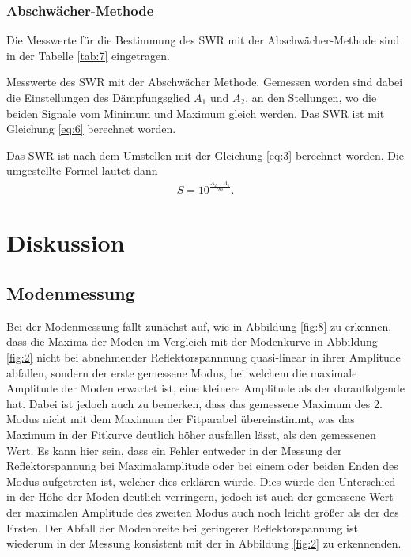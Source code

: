                 \subsubsection{Abschwächer-Methode}
                    Die Messwerte für die Bestimmung des SWR mit der Abschwächer-Methode sind in der Tabelle \ref{tab:7} eingetragen.
                        \begin{table}[H]
                            \centering
                            \caption{
                                Messwerte des SWR mit der Abschwächer Methode.
                                Gemessen worden sind dabei die Einstellungen des Dämpfungsglied $A_1$ und $A_2$, an den Stellungen,
                                wo die beiden Signale vom Minimum und Maximum gleich werden. Das SWR ist mit Gleichung \eqref{eq:6} berechnet worden.
                            }
                            
                            \label{tab:7} 
                        \end{table} 
                        Das SWR ist nach dem Umstellen mit der Gleichung \eqref{eq:3} berechnet worden.
                        Die umgestellte Formel lautet dann
                        \begin{align}
                            S = 10^{\frac{A_2-A_1}{20}}. \label{eq:6}
                        \end{align}

%
%
    \section{Diskussion}
        
        \subsection{Modenmessung}
            Bei der Modenmessung fällt zunächst auf, wie in Abbildung \ref{fig:8} zu erkennen, dass die Maxima der Moden im Vergleich mit der Modenkurve in Abbildung \ref{fig:2} nicht bei abnehmender Reflektorspannnung quasi-linear in ihrer Amplitude abfallen, sondern der erste gemessene Modus, bei welchem die maximale Amplitude der Moden erwartet ist, eine kleinere Amplitude als der darauffolgende hat.\newline
            Dabei ist jedoch auch zu bemerken, dass das gemessene Maximum des 2. Modus nicht mit dem Maximum der Fitparabel übereinstimmt, was das Maximum in der Fitkurve deutlich höher ausfallen lässt, als den gemessenen Wert.
            \newline
            Es kann hier sein, dass ein Fehler entweder in der Messung der Reflektorspannung bei Maximalamplitude oder bei einem oder beiden Enden des Modus aufgetreten ist, welcher dies erklären würde.
            Dies würde den Unterschied in der Höhe der Moden deutlich verringern, jedoch ist auch der gemessene Wert der maximalen Amplitude des zweiten Modus auch noch leicht größer als der des Ersten.
            \newline
            Der Abfall der Modenbreite bei geringerer Reflektorspannung ist wiederum in der Messung konsistent mit der in Abbildung \ref{fig:2} zu erkennenden.
            

